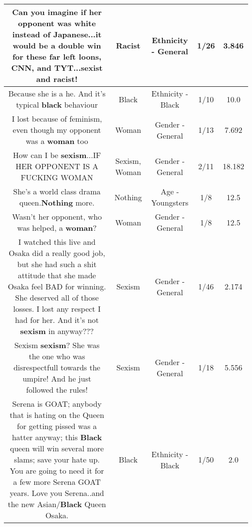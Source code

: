 \documentclass[11pt]{article}
\newlength\mylength
\begin{document}
\begin{center}
\begin{longtable}{|C{.65\mylength}|C{.30\mylength}|C{.12\mylength}|C{.12\mylength}|C{.12\mylength}|}
  \small Can you imagine if her opponent was white instead of Japanese...it would be a double win for these far left loons, CNN, and TYT...sexist and \textbf{racist}!\normalsize   & Racist & Ethnicity - General & 1/26 & 3.846 \\  \hline
  \small Because she is a he. And it's typical \textbf{black} behaviour\normalsize   & Black & Ethnicity - Black & 1/10 & 10.0 \\  \hline
  \small I lost because of feminism, even though my opponent was a \textbf{woman} too\normalsize   & Woman & Gender - General & 1/13 & 7.692 \\  \hline
  \small How can I be \textbf{sexism}...IF HER OPPONENT IS A FUCKING WOMAN\normalsize   & Sexism, Woman & Gender - General & 2/11 & 18.182 \\  \hline
  \small She's a world class drama queen.\textbf{Nothing} more.\normalsize   & Nothing & Age - Youngsters & 1/8 & 12.5 \\  \hline
  \small Wasn't her opponent, who was helped, a \textbf{woman}?\normalsize   & Woman & Gender - General & 1/8 & 12.5 \\  \hline
  \small I watched this live and Osaka did a really good job, but she had such a shit attitude that she made Osaka feel BAD for winning. She deserved all of those losses. I lost any respect I had for her. And it's not \textbf{sexism} in anyway???\normalsize   & Sexism & Gender - General & 1/46 & 2.174 \\  \hline
  \small Sexism \textbf{sexism}? She was the one who was disrespectfull towards the umpire! And he just followed the rules!\normalsize   & Sexism & Gender - General & 1/18 & 5.556 \\  \hline
  \small Serena is GOAT; anybody that is hating on the Queen for getting pissed was a hatter anyway; this \textbf{Black} queen will win several more slams; save your hate up.  You are going to need it for a few more Serena GOAT years.  Love you Serena..and the new Asian/\textbf{Black} Queen Osaka.\normalsize   & Black & Ethnicity - Black & 1/50 & 2.0 \\  \hline

\end{longtable}
\end{center}
\end{document}
